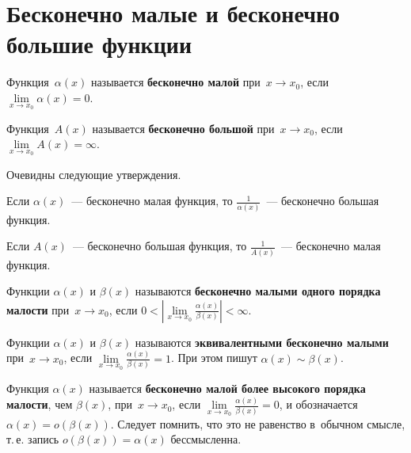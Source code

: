\section{Бесконечно малые и бесконечно большие функции}
 Функция~$\alpha(x)$ называется \textbf{бесконечно малой} при~$x \to x_0$, если $\lim\limits_{x \to x_0} \alpha(x) = 0$.

 Функция~$A(x)$ называется \textbf{бесконечно большой} при~$x \to x_0$, если $\lim\limits_{x \to x_0} A(x) = \infty$.

Очевидны следующие утверждения.
\begin{statement}
Если $\alpha(x)$~--- бесконечно малая функция, то $\frac1{\alpha(x)}$~--- бесконечно большая функция.
\end{statement}

\begin{statement}
Если $A(x)$~--- бесконечно большая функция, то $\frac1{A(x)}$~--- бесконечно малая функция.
\end{statement}

Функции $\alpha(x)$ и $\beta(x)$ называются \textbf{бесконечно малыми одного порядка малости} при~$x \to x_0$, если\linebreak
$0 < \left| \lim\limits_{x \to x_0} \frac{\alpha(x)}{\beta(x)} \right| < \infty$.

Функции $\alpha(x)$ и $\beta(x)$ называются \textbf{эквивалентными бесконечно малыми} при~$x \to x_0$, если
$\lim\limits_{x \to x_0} \frac{\alpha(x)}{\beta(x)} = 1$.
При этом пишут $\alpha(x) \sim \beta(x)$.

Функция $\alpha(x)$ называется \textbf{бесконечно малой более высокого порядка малости}, чем $\beta(x)$, при~$x \to x_0$, если
$\lim\limits_{x \to x_0} \frac{\alpha(x)}{\beta(x)} = 0$, и обозначается $\alpha(x) = o(\beta(x))$.
Следует помнить, что это не равенство в~обычном смысле, т.\,е. запись $o(\beta(x)) = \alpha(x)$ бессмысленна.